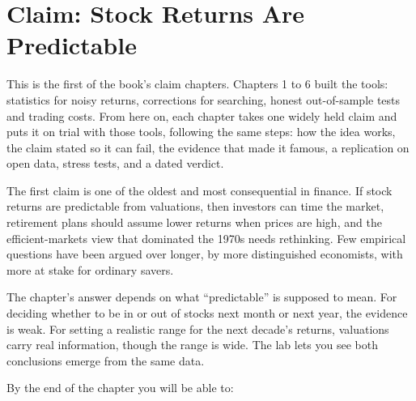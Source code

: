 \makeatletter
{}
\makeatother

\chapter{Claim: Stock Returns Are Predictable}
\label{ch:07}

This is the first of the book's claim chapters. Chapters 1 to 6 built the tools: statistics for noisy returns, corrections for searching, honest out-of-sample tests and trading costs. From here on, each chapter takes one widely held claim and puts it on trial with those tools, following the same steps: how the idea works, the claim stated so it can fail, the evidence that made it famous, a replication on open data, stress tests, and a dated verdict.

The first claim is one of the oldest and most consequential in finance. If stock returns are predictable from valuations, then investors can time the market, retirement plans should assume lower returns when prices are high, and the efficient-markets view that dominated the 1970s needs rethinking. Few empirical questions have been argued over longer, by more distinguished economists, with more at stake for ordinary savers.

The chapter's answer depends on what ``predictable'' is supposed to mean. For deciding whether to be in or out of stocks next month or next year, the evidence is weak. For setting a realistic range for the next decade's returns, valuations carry real information, though the range is wide. The lab lets you see both conclusions emerge from the same data.

By the end of the chapter you will be able to:

